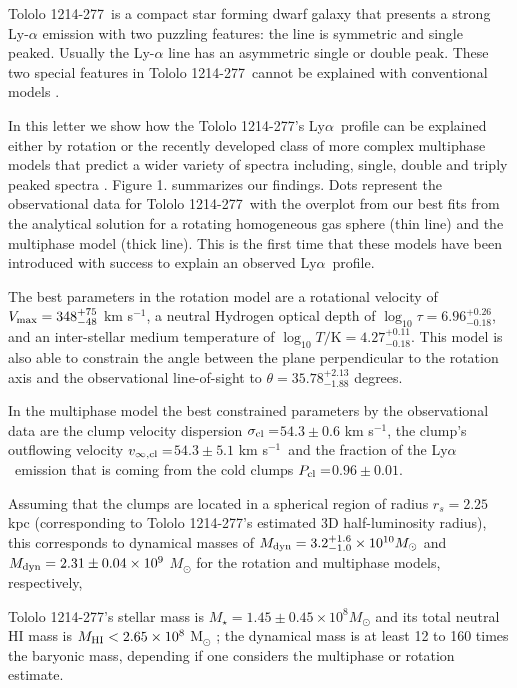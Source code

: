 \documentclass[a4paper, usenatbib, 12pt]{article}
\newcommand{\tol}{Tololo 1214-277}
\newcommand{\lya}{Ly$\alpha$}
\newcommand{\kms}{km s$^{-1}$}
\newcommand{\sigmaclump}{$54.3\pm 0.6$ km s$^{-1}$}
\newcommand{\inftyclump}{$54.3\pm 5.1$ km s$^{-1}$}
\newcommand{\probaclump}{$0.96\pm 0.01$}
\begin{document}
{\tol\ is a compact star forming dwarf galaxy that presents a
strong Ly-$\alpha$ emission \cite{Thuan97} with two puzzling 
features: the line is symmetric and single peaked.
Usually the Ly-$\alpha$ line has an asymmetric single or double peak. 
These two special features in \tol\ cannot be explained with
conventional models \cite{2006A&A...460..397V,2015ApJ...812..123G}.  

In this letter we show how the \tol's \lya\ profile can be explained
either by rotation \cite{GaravitoCamargo2014} or the recently developed
class of more complex 
multiphase models that predict a wider variety of spectra
including, single, double and triply peaked spectra \cite{Gronke2016}.  
Figure 1. summarizes our findings.
Dots represent the observational data for \tol\ with the
overplot from our best fits from the analytical solution for a
rotating homogeneous gas sphere (thin line) and the multiphase
model (thick line). 
This is the first time that these models have been introduced with
success to explain an observed \lya\ profile.   


The best parameters in the rotation model are a rotational velocity of 
$V_{\rm max}=348^{+75}_{-48}$ \kms, a neutral Hydrogen optical depth of 
$\log_{10}\tau=6.96^{+0.26}_{-0.18}$,  and an inter-stellar medium temperature of $\log_{10} T/\mathrm {K} = 4.27^{+0.11}_{-0.18}$.  
This model is also able to constrain the angle between the plane
perpendicular to the rotation axis and the observational line-of-sight
to $\theta = 35.78^{+2.13}_{-1.88}$ degrees.

In the multiphase model the best constrained parameters by the
observational data are the clump velocity dispersion
$\sigma_{\rm{cl}}=$\sigmaclump ,  the clump's outflowing velocity
$v_{\infty, \rm{cl}}=$\inftyclump\ and the fraction of the
\lya\ emission that is  coming from the cold clumps  $P_{\rm cl}=$\probaclump.


Assuming that the clumps are located in a spherical region of radius
$r_s=2.25$ kpc (corresponding to \tol's estimated 3D half-luminosity
radius), 
this corresponds to dynamical masses of $M_{\rm dyn} =
3.2_{-1.0}^{+1.6}\times 10^{10} M_{\odot}$ and $M_{\rm
  dyn}=2.31\pm0.04 \times 10^{9}$ $M_{\odot}$ for the
rotation and multiphase models, respectively, 

\tol's stellar mass is  $M_{\star} = 1.45\pm0.45\times 10^{8}
M_{\odot}$   \cite{2014PASP..126.1079M} and its total neutral HI mass is $M_{\rm HI}<2.65\times 10^{8}$ M$_{\odot}$
\cite{pustilnikmartin07}; the dynamical mass is at least 12 to 160 times
the baryonic mass, depending if one considers the multiphase or
rotation estimate. 

}
\end{document}
